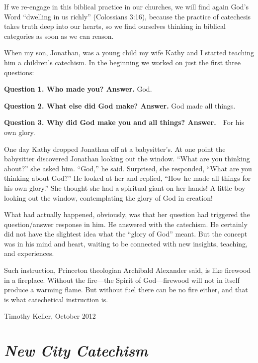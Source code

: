 \documentclass[]{memoir}
\begin{document}
If we re-engage in this biblical practice in our churches, we will find again God's Word ``dwelling in us richly'' (Colossians 3:16), because the practice of catechesis takes truth deep into our hearts, so we find ourselves thinking in biblical categories as soon as we can reason.

When my son, Jonathan, was a young child my wife Kathy and I started teaching him a children's catechism. In the beginning we worked on just the first three questions:

\textbf{Question 1. Who made you?\newline
Answer.} God.

\textbf{Question 2. What else did God make?\newline
Answer.} God made all things.

\textbf{Question 3. Why did God make you and all things?\newline
Answer.}\ \ For his own glory.

One day Kathy dropped Jonathan off at a babysitter's. At one point the babysitter discovered Jonathan looking out the window. ``What are you thinking about?'' she asked him. ``God,'' he said. Surprised, she responded, ``What are you thinking about God?'' He looked at her and replied, ``How he made all things for his own glory.'' She thought she had a spiritual giant on her hands! A little boy looking out the window, contemplating the glory of God in creation!

What had actually happened, obviously, was that her question had triggered the question/answer response in him. He answered with the catechism. He certainly did not have the slightest idea what the ``glory of God'' meant. But the concept was in his mind and heart, waiting to be connected with new insights, teaching, and experiences.

Such instruction, Princeton theologian Archibald Alexander said, is like firewood in a fireplace. Without the fire\thinspace{}---\thinspace{}the Spirit of God\thinspace{}---\thinspace{}firewood will not in itself produce a warming flame. But without fuel there can be no fire either, and that is what catechetical instruction is.

\bigskip

{\raggedleft
Timothy Keller, October 2012}

\cleardoublepage

\chapter{\em New City Catechism}
\end{document}
